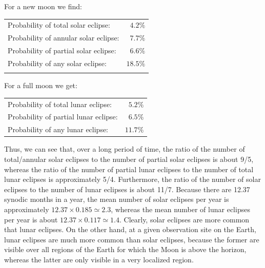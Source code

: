 For a new moon we find:
\begin{center}
\begin{tabular}{lr}
Probability of total solar eclipse: &$4.2\%$\\
Probability of annular solar eclipse: &$7.7\%$\\
Probability of partial solar eclipse: &$6.6\%$\\
Probability of any solar eclipse:&$18.5\%$\\
&\\
\end{tabular}
\end{center}

For a full moon we get:
\begin{center}
\begin{tabular}{lr}
Probability of total lunar eclipse:& $5.2\%$\\
Probability of partial lunar eclipse: & $6.5\%$\\
Probability of any lunar eclipse:&$11.7\%$\\
\end{tabular}
\end{center}

Thus, we can see that, over a long  period of time, the ratio of the number of total/annular solar eclipses to the number of partial solar
eclipses is about 9/5, whereas the ratio of the number of partial 
lunar eclipses to the number of total lunar eclipses is approximately 5/4. Furthermore,
the ratio of the number of solar eclipses to the number of lunar eclipses
is about 11/7. Because there are 12.37 synodic months in a year, the
mean number of solar eclipses per year is approximately $12.37\times 0.185\simeq 2.3$,
whereas the mean number of lunar eclipses per year is about $12.37\times 0.117\simeq 1.4$. Clearly, solar eclipses are more  common that lunar
eclipses. On the other hand, at a given observation site on the Earth, lunar eclipses
are much more common than solar eclipses, because the former are visible
 over all regions of the Earth for which the Moon is above the horizon, whereas the latter are only visible in a very localized
region.

